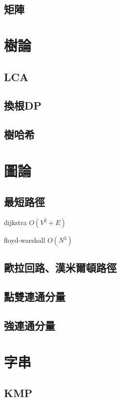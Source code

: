 \documentclass[a4paper,10pt,twocolumn,oneside]{article}
\begin{document}
\subsection{矩陣}



\section{樹論}
\subsection{LCA}

\subsection{換根DP}

\subsection{樹哈希}


\section{圖論}
\subsection{最短路徑}
dijkstra $O({V}^2 + E)$

floyd-warshall $O({N}^3)$

\subsection{歐拉回路、漢米爾頓路徑}


\subsection{點雙連通分量}

\subsection{強連通分量}



\section{字串}
\subsection{KMP}

\end{document}

